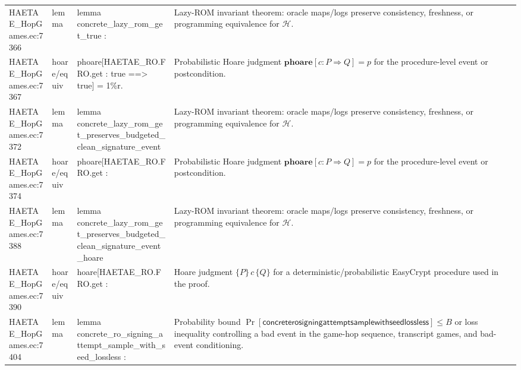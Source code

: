 \documentclass[10pt]{article}
\begin{document}
\begin{longtable}{L{0.11\textwidth}L{0.055\textwidth}L{0.385\textwidth}L{0.41\textwidth}}
HAETAE\_\allowbreak{}HopGames.\allowbreak{}ec:\allowbreak{}7366 & lemma & {\ttfamily\scriptsize lemma concrete\_\allowbreak{}lazy\_\allowbreak{}rom\_\allowbreak{}get\_\allowbreak{}true :} & Lazy-ROM invariant theorem: oracle maps/logs preserve consistency, freshness, or programming equivalence for $\mathcal H$. \\
HAETAE\_\allowbreak{}HopGames.\allowbreak{}ec:\allowbreak{}7367 & hoare/equiv & {\ttfamily\scriptsize phoare[HAETAE\_\allowbreak{}RO.FRO.get : true ==\textgreater{} true] = 1\%r.} & Probabilistic Hoare judgment $\mathbf{phoare}[c:P\Rightarrow Q]=p$ for the procedure-level event or postcondition. \\
HAETAE\_\allowbreak{}HopGames.\allowbreak{}ec:\allowbreak{}7372 & lemma & {\ttfamily\scriptsize lemma concrete\_\allowbreak{}lazy\_\allowbreak{}rom\_\allowbreak{}get\_\allowbreak{}preserves\_\allowbreak{}budgeted\_\allowbreak{}clean\_\allowbreak{}signature\_\allowbreak{}event} & Lazy-ROM invariant theorem: oracle maps/logs preserve consistency, freshness, or programming equivalence for $\mathcal H$. \\
HAETAE\_\allowbreak{}HopGames.\allowbreak{}ec:\allowbreak{}7374 & hoare/equiv & {\ttfamily\scriptsize phoare[HAETAE\_\allowbreak{}RO.FRO.get :} & Probabilistic Hoare judgment $\mathbf{phoare}[c:P\Rightarrow Q]=p$ for the procedure-level event or postcondition. \\
HAETAE\_\allowbreak{}HopGames.\allowbreak{}ec:\allowbreak{}7388 & lemma & {\ttfamily\scriptsize lemma concrete\_\allowbreak{}lazy\_\allowbreak{}rom\_\allowbreak{}get\_\allowbreak{}preserves\_\allowbreak{}budgeted\_\allowbreak{}clean\_\allowbreak{}signature\_\allowbreak{}event\_\allowbreak{}hoare} & Lazy-ROM invariant theorem: oracle maps/logs preserve consistency, freshness, or programming equivalence for $\mathcal H$. \\
HAETAE\_\allowbreak{}HopGames.\allowbreak{}ec:\allowbreak{}7390 & hoare/equiv & {\ttfamily\scriptsize hoare[HAETAE\_\allowbreak{}RO.FRO.get :} & Hoare judgment $\{P\}\,c\,\{Q\}$ for a deterministic/probabilistic EasyCrypt procedure used in the proof. \\
HAETAE\_\allowbreak{}HopGames.\allowbreak{}ec:\allowbreak{}7404 & lemma & {\ttfamily\scriptsize lemma concrete\_\allowbreak{}ro\_\allowbreak{}signing\_\allowbreak{}attempt\_\allowbreak{}sample\_\allowbreak{}with\_\allowbreak{}seed\_\allowbreak{}lossless :} & Probability bound $\Pr[\mathsf{concreterosigningattemptsamplewithseedlossless}]\le B$ or loss inequality controlling a bad event in the game-hop sequence, transcript games, and bad-event conditioning. \\

\end{longtable}
\end{document}
